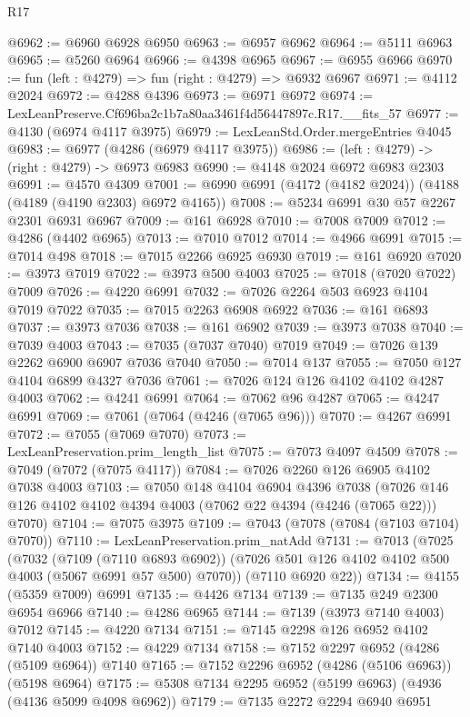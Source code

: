 \begin{lexlean}{R17}
\begin{coremodule}
@6962 := @6960 @6928 @6950
@6963 := @6957 @6962
@6964 := @5111 @6963
@6965 := @5260 @6964
@6966 := @4398 @6965
@6967 := @6955 @6966
@6970 := fun (left : @4279) => fun (right : @4279) => @6932 @6967
@6971 := @4112 @2024
@6972 := @4288 @4396
@6973 := @6971 @6972
@6974 := LexLeanPreserve.Cf696ba2c1b7a80aa3461f4d56447897c.R17.__fits_57
@6977 := @4130 (@6974 @4117 @3975)
@6979 := LexLeanStd.Order.mergeEntries @4045
@6983 := @6977 (@4286 (@6979 @4117 @3975))
@6986 := (left : @4279) -> (right : @4279) -> @6973 @6983
@6990 := @4148 @2024 @6972 @6983 @2303
@6991 := @4570 @4309
@7001 := @6990 @6991 (@4172 (@4182 @2024)) (@4188 (@4189 (@4190 @2303) @6972 @4165))
@7008 := @5234 @6991 @30 @57 @2267 @2301 @6931 @6967
@7009 := @161 @6928
@7010 := @7008 @7009
@7012 := @4286 (@4402 @6965)
@7013 := @7010 @7012
@7014 := @4966 @6991
@7015 := @7014 @498
@7018 := @7015 @2266 @6925 @6930
@7019 := @161 @6920
@7020 := @3973 @7019
@7022 := @3973 @500 @4003
@7025 := @7018 (@7020 @7022) @7009
@7026 := @4220 @6991
@7032 := @7026 @2264 @503 @6923 @4104 @7019 @7022
@7035 := @7015 @2263 @6908 @6922
@7036 := @161 @6893
@7037 := @3973 @7036
@7038 := @161 @6902
@7039 := @3973 @7038
@7040 := @7039 @4003
@7043 := @7035 (@7037 @7040) @7019
@7049 := @7026 @139 @2262 @6900 @6907 @7036 @7040
@7050 := @7014 @137
@7055 := @7050 @127 @4104 @6899 @4327 @7036
@7061 := @7026 @124 @126 @4102 @4102 @4287 @4003
@7062 := @4241 @6991
@7064 := @7062 @96 @4287
@7065 := @4247 @6991
@7069 := @7061 (@7064 (@4246 (@7065 @96)))
@7070 := @4267 @6991
@7072 := @7055 (@7069 @7070)
@7073 := LexLeanPreservation.prim_length_list
@7075 := @7073 @4097 @4509
@7078 := @7049 (@7072 (@7075 @4117))
@7084 := @7026 @2260 @126 @6905 @4102 @7038 @4003
@7103 := @7050
    @148
    @4104
    @6904
    @4396
    @7038
    (@7026 @146 @126 @4102 @4102 @4394 @4003 (@7062 @22 @4394 (@4246 (@7065 @22))) @7070)
@7104 := @7075 @3975
@7109 := @7043 (@7078 (@7084 (@7103 @7104) @7070))
@7110 := LexLeanPreservation.prim_natAdd
@7131 := @7013
    (@7025
      (@7032
        (@7109 (@7110 @6893 @6902))
        (@7026 @501 @126 @4102 @4102 @500 @4003 (@5067 @6991 @57 @500) @7070))
      (@7110 @6920 @22))
@7134 := @4155 (@5359 @7009) @6991
@7135 := @4426 @7134
@7139 := @7135 @249 @2300 @6954 @6966
@7140 := @4286 @6965
@7144 := @7139 (@3973 @7140 @4003) @7012
@7145 := @4220 @7134
@7151 := @7145 @2298 @126 @6952 @4102 @7140 @4003
@7152 := @4229 @7134
@7158 := @7152 @2297 @6952 (@4286 (@5109 @6964)) @7140
@7165 := @7152 @2296 @6952 (@4286 (@5106 @6963)) (@5198 @6964)
@7175 := @5308 @7134 @2295 @6952 (@5199 @6963) (@4936 (@4136 @5099 @4098 @6962))
@7179 := @7135 @2272 @2294 @6940 @6951

\end{coremodule}
\end{lexlean}
